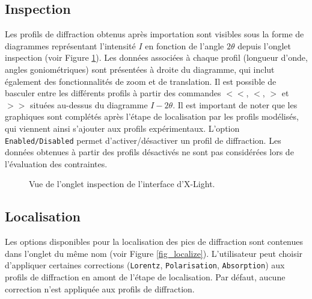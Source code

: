 \documentclass[french,a4paper]{report}
\begin{document}
\subsection{Inspection}

\label{sec_visualisation}

Les profils de diffraction obtenus après importation sont visibles sous la forme de diagrammes représentant l'intensité $I$ en fonction de l'angle $2\theta$ depuis l'onglet inspection (voir Figure \ref{fig_inspect}). Les données associées à chaque profil (longueur d'onde, angles goniométriques) sont présentées à droite du diagramme, qui inclut également des fonctionnalités de zoom et de translation. Il est possible de basculer entre les différents profils à partir des commandes $<<$, $<$, $>$ et $>>$ situées au-dessus du diagramme $I-2\theta$. Il est important de noter que les graphiques sont complétés après l'étape de localisation par les profils modélisés, qui viennent ainsi s'ajouter aux profils expérimentaux. L'option \texttt{Enabled/Disabled} permet d'activer/désactiver un profil de diffraction. Les données obtenues à partir des profils désactivés ne sont pas considérées lors de l'évaluation des contraintes.

\begin{figure}[h!]
\centering
{}
\caption{Vue de l'onglet inspection de l'interface d'X-Light.}
\label{fig_inspect}
\end{figure}

\subsection{Localisation}

Les options disponibles pour la localisation des pics de diffraction sont contenues dans l'onglet du même nom (voir Figure \ref{fig_localize}). L'utilisateur peut choisir d'appliquer certaines corrections (\texttt{Lorentz}, \texttt{Polarisation}, \texttt{Absorption}) aux profils de diffraction en amont de l'étape de localisation. Par défaut, aucune correction n'est appliquée aux profils de diffraction.
\end{document}
